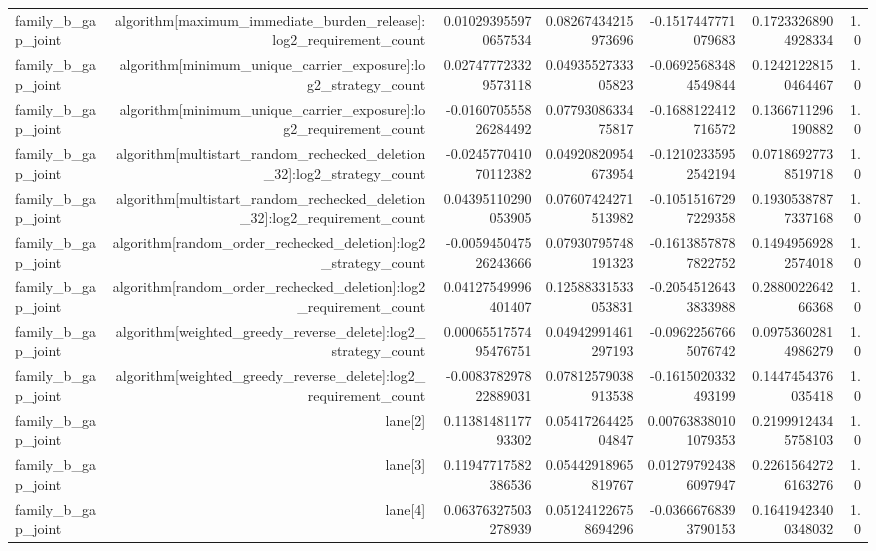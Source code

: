 {\begin{longtable}{lrrrrrr}
family\_b\_gap\_joint & algorithm[maximum\_immediate\_burden\_release]:log2\_requirement\_count & 0.010293955970657534 & 0.08267434215973696 & -0.1517447771079683 & 0.17233268904928334 & 1.0 \\
family\_b\_gap\_joint & algorithm[minimum\_unique\_carrier\_exposure]:log2\_strategy\_count & 0.027477723329573118 & 0.0493552733305823 & -0.06925683484549844 & 0.12421228150464467 & 1.0 \\
family\_b\_gap\_joint & algorithm[minimum\_unique\_carrier\_exposure]:log2\_requirement\_count & -0.016070555826284492 & 0.0779308633475817 & -0.1688122412716572 & 0.1366711296190882 & 1.0 \\
family\_b\_gap\_joint & algorithm[multistart\_random\_rechecked\_deletion\_32]:log2\_strategy\_count & -0.024577041070112382 & 0.04920820954673954 & -0.12102335952542194 & 0.07186927738519718 & 1.0 \\
family\_b\_gap\_joint & algorithm[multistart\_random\_rechecked\_deletion\_32]:log2\_requirement\_count & 0.04395110290053905 & 0.07607424271513982 & -0.10515167297229358 & 0.19305387877337168 & 1.0 \\
family\_b\_gap\_joint & algorithm[random\_order\_rechecked\_deletion]:log2\_strategy\_count & -0.005945047526243666 & 0.07930795748191323 & -0.16138578787822752 & 0.14949569282574018 & 1.0 \\
family\_b\_gap\_joint & algorithm[random\_order\_rechecked\_deletion]:log2\_requirement\_count & 0.04127549996401407 & 0.12588331533053831 & -0.20545126433833988 & 0.288002264266368 & 1.0 \\
family\_b\_gap\_joint & algorithm[weighted\_greedy\_reverse\_delete]:log2\_strategy\_count & 0.0006551757495476751 & 0.04942991461297193 & -0.09622567665076742 & 0.09753602814986279 & 1.0 \\
family\_b\_gap\_joint & algorithm[weighted\_greedy\_reverse\_delete]:log2\_requirement\_count & -0.008378297822889031 & 0.07812579038913538 & -0.1615020332493199 & 0.1447454376035418 & 1.0 \\
family\_b\_gap\_joint & lane[2] & 0.1138148117793302 & 0.0541726442504847 & 0.007638380101079353 & 0.21999124345758103 & 1.0 \\
family\_b\_gap\_joint & lane[3] & 0.11947717582386536 & 0.05442918965819767 & 0.012797924386097947 & 0.22615642726163276 & 1.0 \\
family\_b\_gap\_joint & lane[4] & 0.06376327503278939 & 0.051241226758694296 & -0.03666768393790153 & 0.16419423400348032 & 1.0 \\

\end{longtable}}
